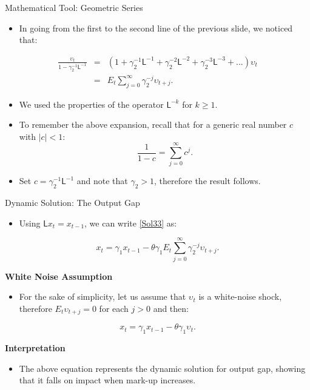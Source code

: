 \documentclass[11pt,aspectratio=169]{beamer}
\begin{document}
\begin{frame}{Mathematical Tool: Geometric Series}
\small

\begin{itemize}
    \item In going from the first to the second line of the previous slide, we noticed that:
\end{itemize}
\begin{eqnarray*}
\frac{\upsilon _{t}}{1-\gamma _{2}^{-1}\mathsf{L}^{-1}} &=&(1+\gamma
_{2}^{-1}\mathsf{L}^{-1}+\gamma _{2}^{-2}\mathsf{L}^{-2}+\gamma _{2}^{-3}%
\mathsf{L}^{-3}+...)\upsilon _{t} \\
&=&E_{t}\sum_{j=0}^{\infty }\gamma _{2}^{-j}\upsilon _{t+j}.
\end{eqnarray*}
\begin{itemize}
    \item We used the properties of the operator $\mathsf{L}^{-k}$ for $k\geq 1.$
\end{itemize}
\begin{itemize}
    \item To remember the above expansion, recall that for a generic real number $c$ with $|c|<1$:
    \begin{equation*}
    \frac{1}{1-c}=\sum_{j=0}^{\infty }c^{j}.
    \end{equation*}
    \item Set $c=\gamma _{2}^{-1}\mathsf{L}^{-1}$ and note that $\gamma _{2}>1$, therefore the result follows.
\end{itemize}

\end{frame}

\begin{frame}{Dynamic Solution: The Output Gap}
\small

\begin{itemize}
    \item Using $\mathsf{L}x_{t}=x_{t-1}$, we can write \eqref{Sol33} as:
\end{itemize}
\begin{equation*}
x_{t}=\gamma _{1}x_{t-1}-\theta \gamma _{1}E_{t}\sum_{j=0}^{\infty }\gamma
_{2}^{-j}\upsilon _{t+j}.
\end{equation*}

\textbf{White Noise Assumption}
\begin{itemize}
    \item For the sake of simplicity, let us assume that $\upsilon _{t}$ is a white-noise shock, therefore $E_{t}\upsilon _{t+j}=0$ for each $j>0$ and then:
\end{itemize}
\begin{equation*}
x_{t}=\gamma _{1}x_{t-1}-\theta \gamma _{1}\upsilon _{t}.
\end{equation*}

\textbf{Interpretation}
\begin{itemize}
    \item The above equation represents the dynamic solution for output gap, showing that it falls on impact when mark-up increases.
\end{itemize}

\end{frame}
\end{document}
